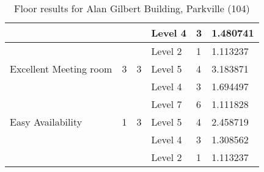 \begin{table}[H]
{\begin{tabular}{|l|l|l|l|l|l|}
                       &                &                         & Level 4     & 3    & 1.480741 \\ \hline
                       &                &                         & Level 2     & 1    & 1.113237 \\ \hline
Excellent Meeting room & 3              & 3                       & Level 5     & 4    & 3.183871 \\ \hline
                       &                &                         & Level 4     & 3    & 1.694497 \\ \hline
                       &                &                         & Level 7     & 6    & 1.111828 \\ \hline
Easy Availability      & 1              & 3                       & Level 5     & 4    & 2.458719 \\ \hline
                       &                &                         & Level 4     & 3    & 1.308562 \\ \hline
                       &                &                         & Level 2     & 1    & 1.113237 \\ \hline
\end{tabular}
}
\caption{Floor results for Alan Gilbert Building, Parkville (104)}
\label{appendix:alan_mr_floor}
\end{table}


